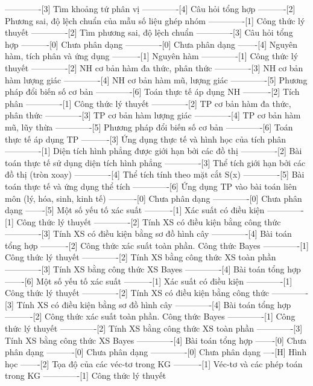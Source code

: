-------------[3] Tìm khoảng tứ phân vị
-------------[4] Câu hỏi tổng hợp
----------[2] Phương sai, độ lệch chuẩn của mẫu số liệu ghép nhóm
-------------[1] Công thức lý thuyết
-------------[2] Tìm phương sai, độ lệch chuẩn
-------------[3] Câu hỏi tổng hợp
----------[0] Chưa phân dạng
-------------[0] Chưa phân dạng
-------[4] Nguyên hàm, tích phân và ứng dụng
----------[1] Nguyên hàm
-------------[1] Công thức lý thuyết
-------------[2] NH cơ bản hàm đa thức, phân thức
-------------[3] NH cơ bản hàm lượng giác
-------------[4] NH cơ bản hàm mũ, lượng giác
-------------[5] Phương pháp đổi biến số cơ bản
-------------[6] Toán thực tế áp dụng NH
----------[2] Tích phân
-------------[1] Công thức lý thuyết
-------------[2] TP cơ bản hàm đa thức, phân thức
-------------[3] TP cơ bản hàm lượng giác
-------------[4] TP cơ bản hàm mũ, lũy thừa
-------------[5] Phương pháp đổi biến số cơ bản
-------------[6] Toán thực tế áp dụng TP
----------[3] Ứng dụng thực tế và hình học của tích phân
-------------[1] Diện tích hình phẳng được giới hạn bởi các đồ thị
-------------[2] Bài toán thực tế sử dụng diện tích hình phẳng
-------------[3] Thể tích giới hạn bởi các đồ thị (tròn xoay)
-------------[4] Thể tích tính theo mặt cắt S(x)
-------------[5] Bài toán thực tế và ứng dụng thể tích
-------------[6] Ứng dụng TP vào bài toán liên môn (lý, hóa, sinh, kinh tế)
----------[0] Chưa phân dạng
-------------[0] Chưa phân dạng
-------[5] Một số yếu tố xác suất
----------[1] Xác suất có điều kiện
-------------[1] Công thức lý thuyết
-------------[2] Tính XS có điều kiện bằng công thức
-------------[3] Tính XS có điều kiện bằng sơ đồ hình cây
-------------[4] Bài toán tổng hợp
----------[2] Công thức xác suất toàn phần. Công thức Bayes
-------------[1] Công thức lý thuyết
-------------[2] Tính XS bằng công thức XS toàn phần
-------------[3] Tính XS bằng công thức XS Bayes
-------------[4] Bài toán tổng hợp
-------[6] Một số yếu tố xác suất
----------[1] Xác suất có điều kiện
-------------[1] Công thức lý thuyết
-------------[2] Tính XS có điều kiện bằng công thức
-------------[3] Tính XS có điều kiện bằng sơ đồ hình cây
-------------[4] Bài toán tổng hợp
----------[2] Công thức xác suất toàn phần. Công thức Bayes
-------------[1] Công thức lý thuyết
-------------[2] Tính XS bằng công thức XS toàn phần
-------------[3] Tính XS bằng công thức XS Bayes
-------------[4] Bài toán tổng hợp
-------[0] Chưa phân dạng
----------[0] Chưa phân dạng
-------------[0] Chưa phân dạng
----[H] Hình học
-------[2] Tọa độ của các véc-tơ trong KG
----------[1] Véc-tơ và các phép toán trong KG
-------------[1] Công thức lý thuyết
